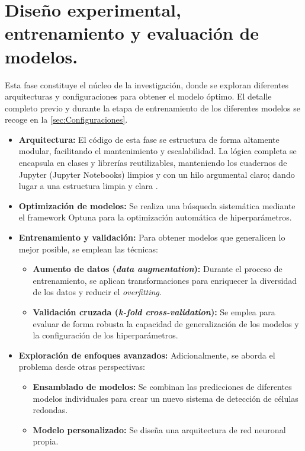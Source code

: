 \documentclass[12pt,a4paper,onecolumn,oneside]{report}
\begin{document}
\section{Diseño experimental, entrenamiento y evaluación de modelos.}
\label{Entrenamiento, validación y evaluación de modelos YOLO}

Esta fase constituye el núcleo de la investigación, donde se exploran diferentes arquitecturas y configuraciones para obtener el modelo óptimo.
El detalle completo previo y durante la etapa de entrenamiento de los diferentes modelos se recoge en la \autoref{sec:Configuraciones}.

\begin{itemize}
  \item \textbf{Arquitectura:} El código de esta fase se estructura de forma altamente modular, facilitando el mantenimiento y escalabilidad. La lógica completa se encapsula en clases y librerías reutilizables, manteniendo los cuadernos de Jupyter 
  (Jupyter Notebooks) limpios y con un hilo argumental claro; dando lugar a una estructura limpia y clara \cite{repoTFM}.
  \item \textbf{Optimización de modelos:} Se realiza una búsqueda sistemática mediante el framework Optuna \cite{Optuna} para la optimización automática de hiperparámetros.
  \item \textbf{Entrenamiento y validación:} Para obtener modelos que generalicen lo mejor posible, se emplean las técnicas:
  \begin{itemize}
    \item \textbf{Aumento de datos (\textit{data augmentation}):} Durante el proceso de entrenamiento, se aplican transformaciones para enriquecer la diversidad de los datos y reducir el \textit{overfitting}.
    \item \textbf{Validación cruzada (\textit{k-fold cross-validation}):} Se emplea para evaluar de forma robusta la capacidad de generalización de los modelos y la configuración de los hiperparámetros.
  \end{itemize} 
  \item \textbf{Exploración de enfoques avanzados:} Adicionalmente, se aborda el problema desde otras perspectivas:
  \begin{itemize}
    \item \textbf{Ensamblado de modelos:} Se combinan las predicciones de diferentes modelos individuales para crear un nuevo sistema de detección de células redondas. 
    \item \textbf{Modelo personalizado:} Se diseña una arquitectura de red neuronal propia. 

\end{itemize}
\end{itemize}
\end{document}
